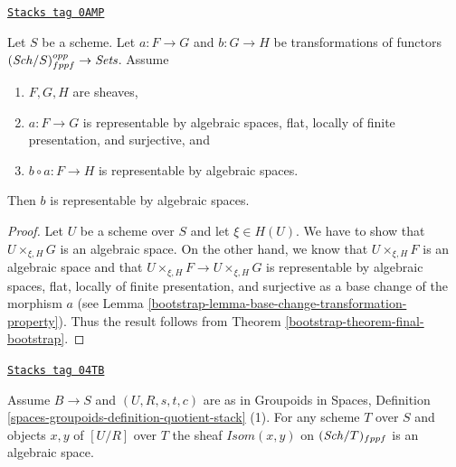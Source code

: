 \begin{lemma}
\label{bootstrap-lemma-representable-by-spaces-cover}
\href{https://stacks.math.columbia.edu/tag/0AMP}{\texttt{Stacks tag 0AMP}}

Let $S$ be a scheme. Let $a : F \to G$ and $b : G \to H$ be
transformations of functors $(\mathit{Sch}/S)_{fppf}^{opp} \to \textit{Sets}$.
Assume
\begin{enumerate}
\item $F, G, H$ are sheaves,
\item $a : F \to G$ is representable by algebraic spaces, flat,
locally of finite presentation, and surjective, and
\item $b \circ a : F \to H$ is representable by algebraic spaces.
\end{enumerate}
Then $b$ is representable by algebraic spaces.
\end{lemma}

\begin{proof}

Let $U$ be a scheme over $S$ and let $\xi \in H(U)$. We have to show that
$U \times_{\xi, H} G$ is an algebraic space. On the other hand, we know
that $U \times_{\xi, H} F$ is an algebraic space and that
$U \times_{\xi, H} F \to U \times_{\xi, H} G$ is representable by
algebraic spaces, flat, locally of finite presentation, and surjective
as a base change of the morphism $a$ (see
Lemma \ref{bootstrap-lemma-base-change-transformation-property}).
Thus the result follows from Theorem \ref{bootstrap-theorem-final-bootstrap}.
\end{proof}

\begin{lemma}
\label{bootstrap-lemma-quotient-stack-isom}
\href{https://stacks.math.columbia.edu/tag/04TB}{\texttt{Stacks tag 04TB}}

Assume $B \to S$ and $(U, R, s, t, c)$ are as in
Groupoids in Spaces,
Definition \ref{spaces-groupoids-definition-quotient-stack} (1).
For any scheme $T$ over $S$ and objects $x, y$ of $[U/R]$ over $T$
the sheaf $\mathit{Isom}(x, y)$ on $(\mathit{Sch}/T)_{fppf}$
is an algebraic space.
\end{lemma}

